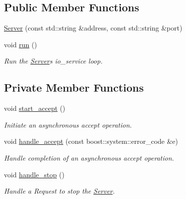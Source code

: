 \subsection*{Public Member Functions}
\begin{DoxyCompactItemize}
\item 
\hyperlink{classwebsocket_1_1Server_a5a619eb7cc286a2288794f0488441a43}{Server} (const std\+::string \&address, const std\+::string \&port)
\item 
void \hyperlink{classwebsocket_1_1Server_afbc99df156a68d67b6a8ecc82e0b7a57}{run} ()
\begin{DoxyCompactList}\small\item\em Run the \hyperlink{classwebsocket_1_1Server}{Server}\textquotesingle{}s io\+\_\+service loop. \end{DoxyCompactList}\end{DoxyCompactItemize}
\subsection*{Private Member Functions}
\begin{DoxyCompactItemize}
\item 
void \hyperlink{classwebsocket_1_1Server_a01514c0f01fc493222b2d8b877dee540}{start\+\_\+accept} ()
\begin{DoxyCompactList}\small\item\em Initiate an asynchronous accept operation. \end{DoxyCompactList}\item 
void \hyperlink{classwebsocket_1_1Server_a3c14a674a090698e82fc59db5df4b3c4}{handle\+\_\+accept} (const boost\+::system\+::error\+\_\+code \&e)
\begin{DoxyCompactList}\small\item\em Handle completion of an asynchronous accept operation. \end{DoxyCompactList}\item 
void \hyperlink{classwebsocket_1_1Server_a4abf8e0742d15023f0ac95ced8aee07a}{handle\+\_\+stop} ()
\begin{DoxyCompactList}\small\item\em Handle a Request to stop the \hyperlink{classwebsocket_1_1Server}{Server}. \end{DoxyCompactList}\end{DoxyCompactItemize}
